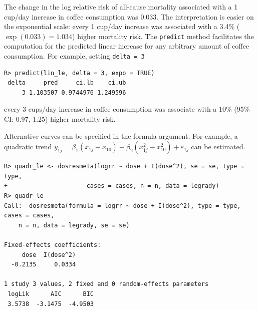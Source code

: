 \documentclass[11pt,a4paper,twoside,openany]{book}\usepackage{knitr}
\begin{document}
{\noindent The change in the log relative risk of all-cause mortality associated with a 1 cup/day increase in coffee consumption was 0.033. The interpretation is easier on the exponential scale: every 1 cup/day increase was associated with a 3.4\%
($\exp(0.033) = 1.034$) higher mortality risk. 
The \texttt{predict} method facilitates the computation for the predicted linear increase for any arbitrary amount of coffee consumption. For example, setting \texttt{delta = 3}

\begin{knitrout}\footnotesize
{}\color{fgcolor}\begin{kframe}
\begin{verbatim}
R> predict(lin_le, delta = 3, expo = TRUE)
 delta     pred     ci.lb    ci.ub
     3 1.103507 0.9744976 1.249596
\end{verbatim}
\end{kframe}
\end{knitrout}


\noindent every 3 cups/day increase in coffee consumption was associate with a 10\% (95\% CI: 0.97, 1.25) higher mortality risk.

Alternative curves can be specified in the formula argument. For example, a quadratic trend $y_{1j} = \beta_1 (x_{1j} - x_{10}) + \beta_2 (x_{1j}^2 - x_{10}^2) + \varepsilon_{1j}$ can be estimated.
\begin{knitrout}\footnotesize
{}\color{fgcolor}\begin{kframe}
\begin{verbatim}
R> quadr_le <- dosresmeta(logrr ~ dose + I(dose^2), se = se, type = type,
+                      cases = cases, n = n, data = legrady)
R> quadr_le
Call:  dosresmeta(formula = logrr ~ dose + I(dose^2), type = type, cases = cases, 
    n = n, data = legrady, se = se)

Fixed-effects coefficients:
     dose  I(dose^2)  
  -0.2135     0.0334  

1 study 3 values, 2 fixed and 0 random-effects parameters
 logLik      AIC      BIC  
 3.5738  -3.1475  -4.9503  
\end{verbatim}
\end{kframe}
\end{knitrout}

}
\end{document}

